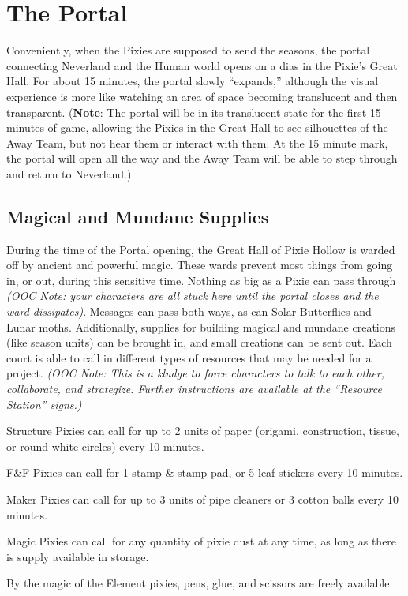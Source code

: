 \documentclass[blue]{PP}
\begin{document}
\section*{The Portal}
Conveniently, when the Pixies are supposed to send the seasons, the portal connecting Neverland and the Human world opens on a dias in the Pixie’s Great Hall. For about 15 minutes, the portal slowly “expands,” although the visual experience is more like watching an area of space becoming translucent and then transparent. (\textbf{Note}: The portal will be in its translucent state for the first 15 minutes of game, allowing the Pixies in the Great Hall to see silhouettes of the Away Team, but not hear them or interact with them. At the 15 minute mark, the portal will open all the way and the Away Team will be able to step through and return to Neverland.)

\subsection*{Magical and Mundane Supplies}
During the time of the Portal opening, the Great Hall of Pixie Hollow is warded off by ancient and powerful magic. These wards prevent most things from going in, or out, during this sensitive time. Nothing as big as a Pixie can pass through \textit{(OOC Note: your characters are all stuck here until the portal closes and the ward dissipates)}. Messages can pass both ways, as can Solar Butterflies and Lunar moths. Additionally, supplies for building magical and mundane creations (like season units) can be brought in, and small creations can be sent out. Each court is able to call in different types of resources that may be needed for a project. \textit{(OOC Note: This is a kludge to force characters to talk to each other, collaborate, and strategize. Further instructions are available at the ``Resource Station'' signs.)}

\begin{iterate}
	\item Structure Pixies can call for up to 2 units of paper (origami, construction, tissue, or round white circles) every 10 minutes.
	\item F\&F Pixies can call for 1 stamp \& stamp pad, or 5 leaf stickers every 10 minutes.
	\item Maker Pixies can call for up to 3 units of pipe cleaners or 3 cotton balls every 10 minutes.
	\item Magic Pixies can call for any quantity of pixie dust at any time, as long as there is supply available in storage.
	\item By the magic of the Element pixies, pens, glue, and scissors are freely available.
\end{iterate}
\end{document}
